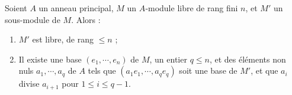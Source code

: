 \documentclass[11pt, useosf,
  title in boldface,
  theorem in new line,
  theorem numbering = section,
  number theorems separately,
]{simplivre}
\begin{document}
    \begin{theorem}\label{thm:base adaptée}
        Soient \( A \) un anneau principal, \( M \) un \( A \)‑module libre de rang fini \( n \), et \( M' \) un sous-module de \( M \). Alors :
        \begin{enumerate}
            \item \label{thm:base adaptée;item1} \( M' \) est libre, de rang \( \leqslant n \) ;
            \item \label{thm:base adaptée;item2} Il existe une base \( (e_1, \cdots, e_n) \) de \( M \), un entier \( q \leqslant n \), et des éléments non nuls \( a_1, \cdots, a_q \) de \( A \) tels que \( (a_1 e_1, \cdots, a_q e_q) \) soit une base de \( M' \), et que \( a_i \) divise \( a_{i+1} \) pour \( 1 \leqslant i \leqslant q-1 \).
        \end{enumerate}
    \end{theorem}
\end{document}
